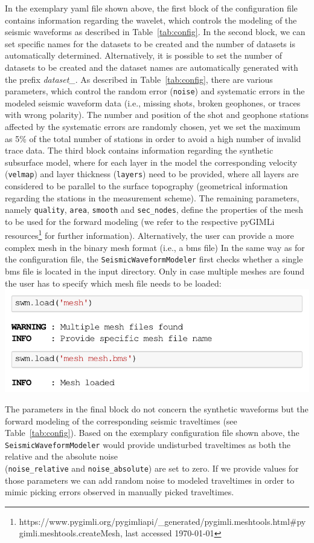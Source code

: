 \documentclass[a4paper,fleqn]{cas-sc}
\begin{document}
In the exemplary yaml file shown above, the first block of the configuration file contains information regarding the wavelet, which controls the modeling of the seismic waveforms as described in Table~\ref{tab:config}.
In the second block, we can set specific names for the datasets to be created and the number of datasets is automatically determined. Alternatively, it is possible to set the number of datasets to be created and the dataset names are automatically generated with the prefix \textit{dataset\_}.
As described in Table~\ref{tab:config}, there are various parameters, which control the random error (\texttt{noise}) and systematic errors in the modeled seismic waveform data (i.e., missing shots, broken geophones, or traces with wrong polarity).
The number and position of the shot and geophone stations affected by the systematic errors are randomly chosen, yet we set the maximum as 5\% of the total number of stations in order to avoid a high number of invalid trace data.
The third block contains information regarding the synthetic subsurface model, where for each layer in the model the corresponding velocity (\texttt{velmap}) and layer thickness (\texttt{layers}) need to be provided, where all layers are considered to be parallel to the surface topography (geometrical information regarding the stations in the measurement scheme). The remaining parameters, namely \texttt{quality}, \texttt{area}, \texttt{smooth} and \texttt{sec\_nodes}, define the properties of the mesh to be used for the forward modeling (we refer to the respective pyGIMLi resources\footnote{https://www.pygimli.org/pygimliapi/\_generated/pygimli.meshtools.html\#pygimli.meshtools.createMesh, last accessed \today} for further information).
Alternatively, the user can provide a more complex mesh in the binary mesh format (i.e., a bms file)
In the same way as for the configuration file, the \texttt{SeismicWaveformModeler} first checks whether a single bms file is located in the input directory. Only in case multiple meshes are found the user has to specify which mesh file needs to be loaded:
\newline
\includegraphics[width=.5\textwidth]{./figures/load_mesh.pdf}

The parameters in the final block do not concern the synthetic waveforms but the forward modeling of the corresponding seismic traveltimes (see Table~\ref{tab:config}). Based on the exemplary configuration file shown above, the\\\texttt{SeismicWaveformModeler} would provide undisturbed traveltimes as both the relative and the absolute noise \\(\texttt{noise\_relative} and \texttt{noise\_absolute}) are set to zero. If we provide values for those parameters we can add random noise to modeled traveltimes in order to mimic picking errors observed in manually picked traveltimes.
\end{document}
